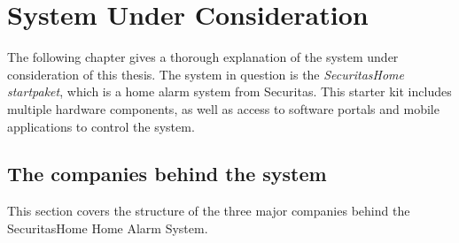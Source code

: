 \chapter{System Under Consideration} \label{ch:system}
The following chapter gives a thorough explanation of the system under consideration of this thesis. The system in question is the \textit{SecuritasHome startpaket}, which is a home alarm system from Securitas. This starter kit includes multiple hardware components, as well as access to software portals and mobile applications to control the system.

\section{The companies behind the system}
This section covers the structure of the three major companies behind the SecuritasHome Home Alarm System.


